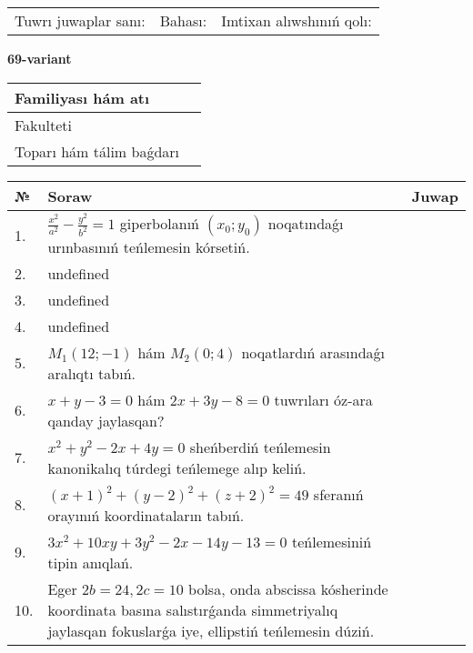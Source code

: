 \documentclass{article}
\begin{document}
\vspace{0.7cm}

\begin{tabular}{lll}
Tuwrı juwaplar sanı: \underline{\hspace{1cm}} & 
Bahası: \underline{\hspace{1cm}} & 
Imtixan alıwshınıń qolı: \underline{\hspace{2cm}} \\
\end{tabular}

\egroup

\newpage


\textbf{69-variant}\\

\bgroup
\def\arraystretch{1.6} %

\begin{tabular}{|m{5.7cm}|m{9.5cm}|}
\hline
Familiyası hám atı & \\
\hline
Fakulteti  & \\
\hline
Toparı hám tálim baǵdarı  & \\
\hline
\end{tabular}

\vspace{0.7cm}

\begin{tabular}{|m{0.7cm}|m{10cm}|m{4cm}|}
\hline
№ & Soraw & Juwap \\
\hline
1. & \(\frac{x^{2}}{a^{2}} - \frac{y^{2}}{b^{2}} = 1\) giperbolanıń \((x_{0};y_{0})\) noqatındaǵı urınbasınıń teńlemesin kórsetiń. &  \\
\hline
2. & undefined &  \\
\hline
3. & undefined &  \\
\hline
4. & undefined &  \\
\hline
5. & \(M_{1} (12; - 1)\) hám \(M_{2} (0;4)\) noqatlardıń arasındaǵı aralıqtı tabıń. &  \\
\hline
6. & \(x + y - 3 = 0\) hám \(2 x + 3 y - 8 = 0\) tuwrıları óz-ara qanday jaylasqan? &  \\
\hline
7. & \(x^{2} + y^{2} - 2 x + 4 y = 0\) sheńberdiń teńlemesin kanonikalıq túrdegi teńlemege alıp keliń. &  \\
\hline
8. & \((x + 1) ^{2} + (y - 2) ^{2} + (z + 2) ^{2} = 49\) sferanıń orayınıń koordinataların tabıń. &  \\
\hline
9. & \(3 x^{2} + 10 xy + 3 y^{2} - 2 x - 14 y - 13 = 0\) teńlemesiniń tipin anıqlań. &  \\
\hline
10. & Eger \(2 b = 24, 2 c = 10\) bolsa, onda abscissa kósherinde koordinata basına salıstırǵanda simmetriyalıq jaylasqan fokuslarǵa iye, ellipstiń teńlemesin dúziń. & \\
\hline
\end{tabular}
\end{document}
